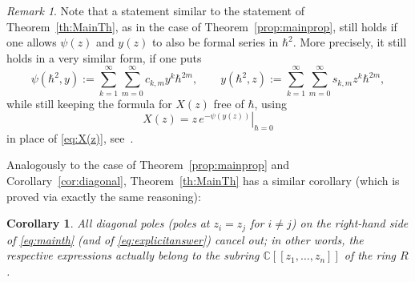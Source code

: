 \documentclass[JEP,XML,SOM,Unicode,NoEqCountersInSection,NoFloatCountersInSection]{cedram}
\newcommand{\llbracket}{[\![}
\newcommand{\rrbracket}{]\!]}
\theoremstyle{plain}
\newtheorem{corollary}[theorem]{Corollary}
\theoremstyle{definition}
\theoremstyle{remark}
\newtheorem{remark}[theorem]{Remark}
\begin{document}
\begin{remark} \label{rem:Hdeformed}
Note that a statement similar to the statement of Theorem~\ref{th:MainTh}, as in the case of Theorem~\ref{prop:mainprop}, still holds if one allows $\psi(z)$ and $y(z)$ to also be formal series in $\hbar^2$. More precisely, it still holds in a very similar form, if one puts
\[
\psi(\hbar^2,y):=\sum_{k=1}^\infty\sum_{m=0}^\infty c_{k,m} y^k\hbar^{2m},\qquad
y(\hbar^2,z):=\sum_{k=1}^\infty\sum_{m=0}^\infty s_{k,m} z^k\hbar^{2m},
\]
while still keeping the formula for $X(z)$ free of $\hbar$, \ie using
\begin{equation*}
X(z)=\left.z\,e^{-\psi(y(z))}\right|_{\hbar=0}
\end{equation*}
in place of \eqref{eq:X(z)}, see~\cite[\S 3]{BDKS21toprec}.
\end{remark}

Analogously to the case of Theorem~\ref{prop:mainprop} and Corollary~\ref{cor:diagonal}, Theorem~\ref{th:MainTh} has a similar corollary (which is proved via exactly the same reasoning):
\begin{corollary}\label{cor:Hdiag}
All diagonal poles (\ie poles at $z_i=z_j$ for $i\neq j$) on the right-hand side of \eqref{eq:mainth} (and of \eqref{eq:explicitanswer}) cancel out; in other words, the respec\-tive expressions actually belong to the subring $\mathbb{C}\llbracket z_1,\dots,z_n\rrbracket $ of the ring $R$.
\end{corollary}
\end{document}
